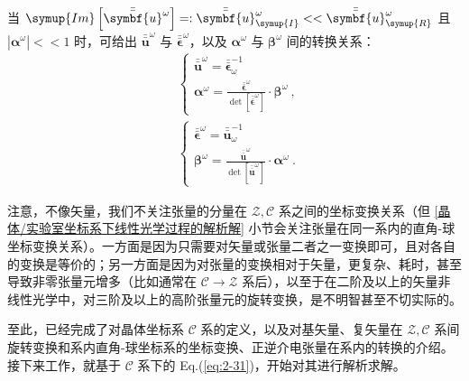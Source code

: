 当 $\symup{Im} \left[ \bar{\bar{\symbf{u}}}^{\omega} \right] =: \bar{\bar{\symbf{u}}}_{\symup{I}}^{\omega} << \bar{\bar{\symbf{u}}}_{\symup{R}}^{\omega}$ 且 $\left| \symbf{\alpha}^\omega \right| << 1$ 时，可给出 $\bar{\bar{\symbf{u}}}^{\omega}$ 与 $\bar{\bar{\symbf{\epsilon}}}^{\omega}$，以及 $\symbf{\alpha}^{\omega}$ 与 $\symbf{\beta}^{\omega}$ 间的转换关系：
\begin{subequations} \label{eq:2-41}
	\begin{align}
		&\begin{cases} \label{eq:2-41a}
			\bar{\bar{\symbf{u}}}^{\omega} = \bar{\bar{\symbf{\epsilon}}}_{\omega}^{-1} \\ \symbf{\alpha}^{\omega} = \displaystyle{ \frac{\bar{\bar{\symbf{\epsilon}}}^{\omega}}{\det \left[ \bar{\bar{\symbf{\epsilon}}}^{\omega} \right]} } \cdot \symbf{\beta}^{\omega}  ~,
		\end{cases}\\
		&\begin{cases} \label{eq:2-41b}
			\bar{\bar{\symbf{\epsilon}}}^{\omega} = \bar{\bar{\symbf{u}}}_{\omega}^{-1} \\ \symbf{\beta}^{\omega} = \displaystyle{ \frac{\bar{\bar{\symbf{u}}}^{\omega}}{\det \left[ \bar{\bar{\symbf{u}}}^{\omega} \right]} } \cdot \symbf{\alpha}^{\omega}  ~.
		\end{cases}
	\end{align}
\end{subequations}

注意，不像矢量，我们不关注张量的分量在 $\mathcal{Z,C}$ 系之间的坐标变换关系（但 \ref{晶体/实验室坐标系下线性光学过程的解析解} 小节会关注张量在同一系内的直角-球坐标变换关系）。一方面是因为只需要对矢量或张量二者之一变换即可，且对各自的变换是等价的；另一方面是因为对张量的变换相对于矢量，更复杂、耗时，甚至导致非零张量元增多（比如通常在 $\mathcal{C} \rightarrow \mathcal{Z}$ 系后），以至于在二阶及以上的矢量非线性光学中，对三阶及以上的高阶张量元的旋转变换，是不明智甚至不切实际的。

至此，已经完成了对晶体坐标系 $\mathcal{C}$ 系的定义，以及对基矢量、复矢量在 $\mathcal{Z,C}$ 系间旋转变换和系内直角-球坐标系的坐标变换、正逆介电张量在系内的转换的介绍。接下来工作，就基于 $\mathcal{C}$ 系下的 Eq.(\ref{eq:2-31})，开始对其进行解析求解。

